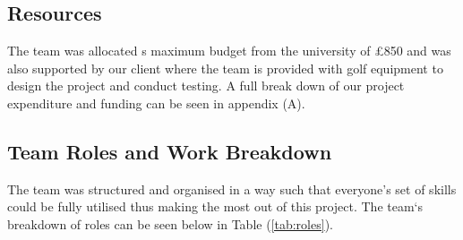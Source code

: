 \documentclass[11pt,landscape]{article}
\begin{document}
\begin{multicols}{2}
\subsection{Resources}
The team was allocated s maximum budget from the university of £850 and was
also supported by our client where the team is provided with golf equipment to
design the project and conduct testing. A full break down of our project
expenditure and funding can be seen in appendix (A). 

\subsection{Team Roles and Work Breakdown}
The team was structured and organised in a way such that everyone's set of skills
could be fully utilised thus making the most out of this project. The team`s
breakdown of roles can be seen below in Table (\ref{tab:roles}). 

\begin{table}[H]
    \begin{center}
        \label{tab:roles}
    \end{center}
\end{table}


\end{multicols}
\end{document}
